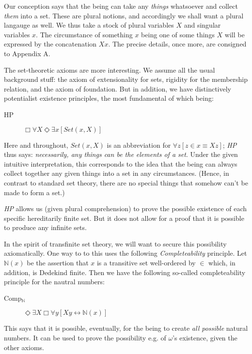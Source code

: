 \documentclass{article}
\begin{document}
Our conception says that the being can take any \emph{things} whatsoever and collect 
\emph{them} into a set. These are plural notions, and accordingly we shall want a plural 
langauge as well. We thus take a stock of plural variables $X$ and singular variables $x$.
The circumstance of something $x$ being one of some things $X$ will be expressed by 
the concatenation $Xx$. The precise details, once more,  are consigned to Appendix A. 

The set-theoretic axioms are more interesting. We assume all the usual 
background stuff: the axiom of extensionality for sets, rigidity for the 
membership relation, and the axiom of foundation. But in addition, we have 
distinctively potentialist existence principles, the most fundamental of which 
being:

\begin{description} 
    \item[HP] $\Box \forall X \Diamond \exists x [Set(x, X)]$
\end{description}
Here and throughout, $Set(x, X)$ is an abbreviation for 
$\forall z[z \in x \equiv Xz]$; \emph{HP} thus says: \emph{necessarily, any 
things can be the elements of a set}. Under the given 
intuitive interpretation, this corresponds to the idea that the being 
can always collect together any given things into a set in any circumstances.  
(Hence, in contrast to standard set theory, there are no 
special things that somehow can't be made to form a set.)

\emph{HP} allows us (given plural comprehension) to prove the possible existence 
of each specific hereditarily finite set. But it does not allow for a proof that 
it is possible to produce any infinite sets. 

In the spirit of transfinite 
set theory, we will want to secure this possibility axiomatically. 
One way to to this uses the following \emph{Completeability} principle. 
Let $\mathbb{N}(x)$ be the assertion that $x$ is a transitive set well-ordered 
by $\in$ which, in addition, is Dedekind finite. Then we have the following 
so-called completeability principle for the nautral numbers:
\begin{description}
    \item[Comp$_\mathbb{N}$]
    $\Diamond \exists X \Box \forall y[ Xy \leftrightarrow \mathbb{N}(x)]$
\end{description}
This says that it is possible, eventually, for the being to create \emph{all possible}
natural numbers. It can be used to prove the possibility 
e.g. of $\omega$'s existence, given the other axioms.
\end{document}
